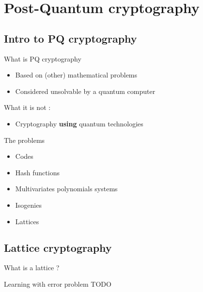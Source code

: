 \documentclass{beamer}
\begin{document}
\section{Post-Quantum cryptography}
\subsection{Intro to PQ cryptography}
\begin{frame}{What is PQ cryptography}
\begin{linenumbers}
	\begin{itemize}
		\item Based on (other) mathematical problems
		\item Considered unsolvable by a quantum computer
	\end{itemize}

	What it is not :
	\begin{itemize}
		\item Cryptography \textbf{using} quantum technologies
	\end{itemize}
\end{linenumbers}
\end{frame}

\begin{frame}{The problems}
	\begin{itemize}
		\item Codes
		\item Hash functions
		\item Multivariates polynomials systems
		\item Isogenies
		\item Lattices
	\end{itemize}
\end{frame}

\subsection{Lattice cryptography}
\begin{frame}{What is a lattice ?}
\end{frame}

\begin{frame}{Learning with error problem}
	TODO
\end{frame}
\end{document}
